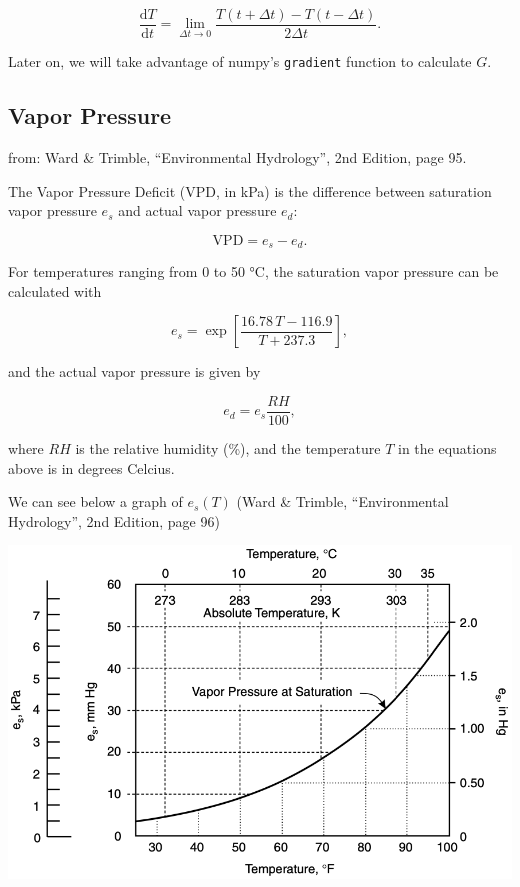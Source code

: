 \documentclass[
  letterpaper,
  DIV=11,
  numbers=noendperiod]{scrreprt}
\begin{document}
\[
\displaystyle \frac{\text{d}T}{\text{d}t} = \lim_{\Delta t\rightarrow 0}\frac{T(t+\Delta t) - T(t-\Delta t)}{2\Delta t}.
\]

Later on, we will take advantage of numpy's \texttt{gradient} function
to calculate \(G\).

\hypertarget{vapor-pressure}{%
\subsection{Vapor Pressure}\label{vapor-pressure}}

from: Ward \& Trimble, ``Environmental Hydrology'', 2nd Edition, page
95.

The Vapor Pressure Deficit (VPD, in kPa) is the difference between
saturation vapor pressure \(e_s\) and actual vapor pressure \(e_d\):

\[\text{VPD} = e_s - e_d.\]

For temperatures ranging from 0 to 50 °C, the saturation vapor pressure
can be calculated with

\[
  \begin{equation}
    e_s = \exp \left[ \frac{16.78\, T -116.9}{T+237.3} \right],
  \end{equation}
\]

and the actual vapor pressure is given by

\[
  \begin{equation}
    e_d = e_s \frac{RH}{100},
  \end{equation}
\]

where \(RH\) is the relative humidity (\%), and the temperature \(T\) in
the equations above is in degrees Celcius.

We can see below a graph of \(e_s(T)\) (Ward \& Trimble, ``Environmental
Hydrology'', 2nd Edition, page 96)

\includegraphics{archive/figures/trimble-figure4.11.png}
\end{document}
